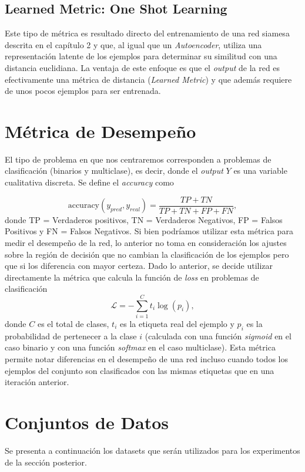 \subsection{Learned Metric: One Shot Learning}

Este tipo de métrica es resultado directo del entrenamiento de una red siamesa descrita en el capítulo 2 y que, al igual que un \textit{Autoencoder}, utiliza una representación latente de los ejemplos para determinar su similitud con una distancia euclidiana. La ventaja de este enfoque es que el \textit{output} de la red es efectivamente una métrica de distancia (\textit{Learned Metric}) y que además requiere de unos pocos ejemplos para ser entrenada. 

\section{Métrica de Desempeño}

El tipo de problema en que nos centraremos corresponden a problemas de clasificación (binarios y multiclase), es decir, donde el \textit{output} $Y$  es una variable cualitativa discreta. Se define el \textit{accuracy} como

\[
\text{accuracy}(y_{pred}, y_{real}) = \frac{TP + TN}{TP + TN + FP + FN} , 
\]
donde TP = Verdaderos positivos, TN = Verdaderos Negativos, FP = Falsos Positivos y FN = Falsos Negativos. Si bien podríamos utilizar esta métrica para medir el desempeño de la red, lo anterior no toma en consideración los ajustes sobre la región de decisión que no cambian la clasificación de los ejemplos pero que si los diferencia con mayor certeza. Dado lo anterior, se decide utilizar directamente la métrica que calcula la función de \textit{loss} en problemas de clasificación 
\[
\mathcal{L} = - \sum_{i=1}^C t_i \log(p_i) , 
\]
donde $C$ es el total de clases, $t_i$ es la etiqueta real del ejemplo y $p_i$ es la probabilidad de pertenecer a la clase $i$ (calculada con una función \textit{sigmoid} en el caso binario y con una función \textit{softmax} en el caso multiclase). Esta métrica permite notar diferencias en el desempeño de una red incluso cuando todos los ejemplos del conjunto son clasificados con las mismas etiquetas que en una iteración anterior. 

\section{Conjuntos de Datos}

Se presenta a continuación los datasets que serán utilizados para los experimentos de la sección posterior.

